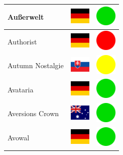 \documentclass[12pt, a4paper, twoside]{report}
\begin{document}
\begin{center}
\begin{longtable}{|p{5cm}|p{2cm}|p{2cm}|}
 Außerwelt                                                  & \includegraphics[width=1cm]{../img/flags/de} &   \includegraphics[width=1cm]{../likes/y} \\ \hline
 Authorist                                                  & \includegraphics[width=1cm]{../img/flags/de} &   \includegraphics[width=1cm]{../likes/n} \\ \hline
 Autumn Nostalgie                                           & \includegraphics[width=1cm]{../img/flags/sk} &   \includegraphics[width=1cm]{../likes/m} \\ \hline
 Avataria                                                   & \includegraphics[width=1cm]{../img/flags/de} &   \includegraphics[width=1cm]{../likes/y} \\ \hline
 Aversions Crown                                            & \includegraphics[width=1cm]{../img/flags/au} &   \includegraphics[width=1cm]{../likes/y} \\ \hline
 Avowal                                                     & \includegraphics[width=1cm]{../img/flags/de} &   \includegraphics[width=1cm]{../likes/y} \\ \hline

\end{longtable}
\end{center}
\end{document}
